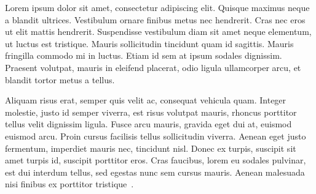 Lorem ipsum dolor sit amet, consectetur adipiscing elit. Quisque
maximus neque a blandit ultrices. Vestibulum ornare finibus metus nec
hendrerit. Cras nec eros ut elit mattis hendrerit. Suspendisse
vestibulum diam sit amet neque elementum, ut luctus est
tristique. Mauris sollicitudin tincidunt quam id sagittis. Mauris
fringilla commodo mi in luctus. Etiam id sem at ipsum sodales
dignissim. Praesent volutpat, mauris in eleifend placerat, odio ligula
ullamcorper arcu, et blandit tortor metus a tellus.

Aliquam risus erat, semper quis velit ac, consequat vehicula
quam. Integer molestie, justo id semper viverra, est risus volutpat
mauris, rhoncus porttitor tellus velit dignissim ligula. Fusce arcu
mauris, gravida eget dui at, euismod euismod arcu. Proin cursus
facilisis tellus sollicitudin viverra. Aenean eget justo fermentum,
imperdiet mauris nec, tincidunt nisl. Donec ex turpis, suscipit sit
amet turpis id, suscipit porttitor eros. Cras faucibus, lorem eu
sodales pulvinar, est dui interdum tellus, sed egestas nunc sem cursus
mauris. Aenean malesuada nisi finibus ex porttitor
tristique~\cite{AADFP04, AAE06, AAER07}.
